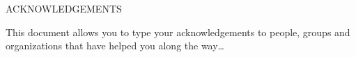 

%
\pagebreak
\addchaptertocentry{\acknowledgementname} %

\begin{center}
\MakeUppercase{Acknowledgements}\\ \bigskip
\end{center}

This document allows you to type your acknowledgements to people, groups and organizations that have helped you along the way\ldots

%


%
%


%
%
\tableofcontents %
%
\listoffigures %


